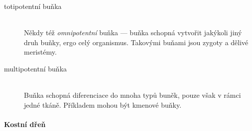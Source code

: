 \documentclass[DIV=8]{scrreprt}
\begin{document}
\begin{description}
\item[totipotentní buňka]\hfill \\
Někdy též \emph{omnipotentní} buňka --- buňka schopná vytvořit jakýkoli jiný druh buňky, ergo celý organismus. Takovými buňami jsou zygoty a dělivé meristémy.


\item[multipotentní buňka]\hfill \\
Buňka schopná diferenciace do mnoha typů buněk, pouze však v rámci jedné tkáně. Příkladem mohou být kmenové buňky.

\end{description}


\paragraph{Kostní dřeň}
\end{document}
